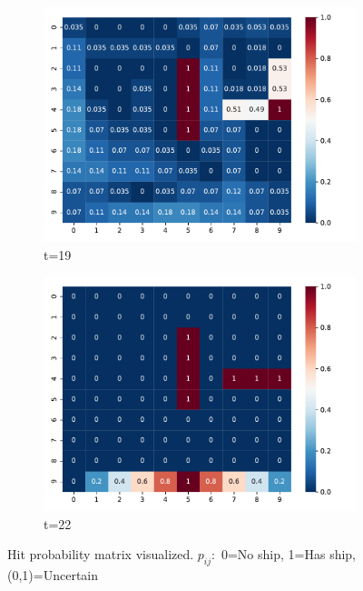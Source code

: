 \begin{figure}
    
    \begin{subfigure}{0.35\textwidth}
        \includegraphics[scale=0.4]{figure/pmatrix/19.pdf}
        \caption{t=19}
    \end{subfigure}
    \begin{subfigure}{0.35\textwidth}
        \includegraphics[scale=0.4]{figure/pmatrix/22.pdf}
        \caption{t=22}
    \end{subfigure}
    \caption{Hit probability matrix visualized. $p_{ij}:$ 0=No ship, 1=Has ship, (0,1)=Uncertain}
    \label{fig:Pmatrix}
\end{figure}

